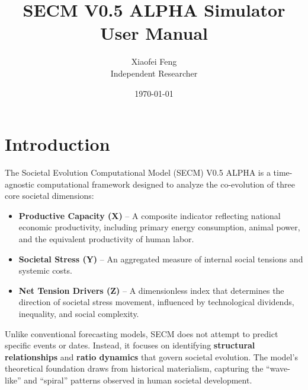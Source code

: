 \documentclass[12pt,a4paper]{article}
\title{\textbf{SECM V0.5 ALPHA Simulator User Manual}}
\author{Xiaofei Feng \\ Independent Researcher}
\date{\today}
\begin{document}
\maketitle
\thispagestyle{empty}
\newpage

\tableofcontents
\newpage

\section{Introduction}

The Societal Evolution Computational Model (SECM) V0.5 ALPHA is a 
time-agnostic computational framework designed to analyze the co-evolution 
of three core societal dimensions:

\begin{itemize}
    \item \textbf{Productive Capacity (X)} – A composite indicator 
    reflecting national economic productivity, including primary energy 
    consumption, animal power, and the equivalent productivity of human labor.
    
    \item \textbf{Societal Stress (Y)} – An aggregated measure of 
    internal social tensions and systemic costs.
    
    \item \textbf{Net Tension Drivers (Z)} – A dimensionless index that 
    determines the direction of societal stress movement, influenced by 
    technological dividends, inequality, and social complexity.
\end{itemize}

Unlike conventional forecasting models, SECM does not attempt to predict specific events or dates.  
Instead, it focuses on identifying \textbf{structural relationships} and \textbf{ratio dynamics} 
that govern societal evolution. The model's theoretical foundation draws from 
historical materialism, capturing the ``wave-like'' and ``spiral'' patterns 
observed in human societal development.
\end{document}
